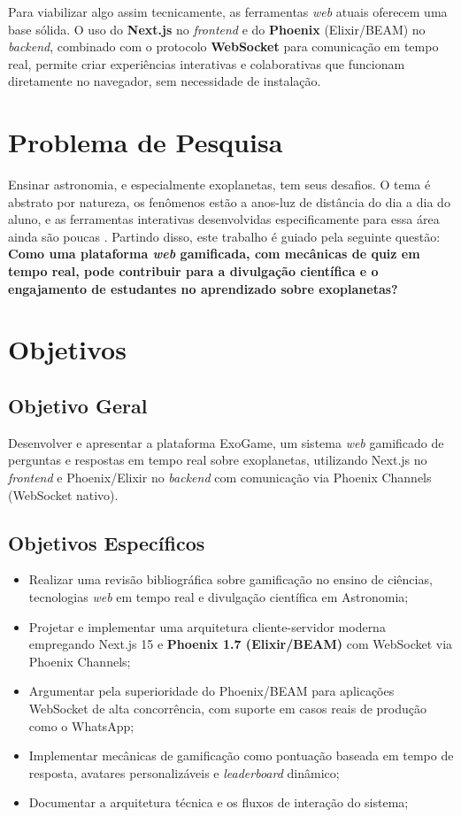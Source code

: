 \documentclass[
	12pt,
	openany,
	oneside,
	a4paper,
	english,
	brazil
]{abntex2}
\begin{document}
Para viabilizar algo assim tecnicamente, as ferramentas \textit{web} atuais oferecem uma base sólida. O uso do \textbf{Next.js} no \textit{frontend} e do \textbf{Phoenix} (Elixir/BEAM) no \textit{backend}, combinado com o protocolo \textbf{WebSocket} para comunicação em tempo real, permite criar experiências interativas e colaborativas que funcionam diretamente no navegador, sem necessidade de instalação.
\section{Problema de Pesquisa}

Ensinar astronomia, e especialmente exoplanetas, tem seus desafios. O tema é abstrato por natureza, os fenômenos estão a anos-luz de distância do dia a dia do aluno, e as ferramentas interativas desenvolvidas especificamente para essa área ainda são poucas \cite{langhi2009}. Partindo disso, este trabalho é guiado pela seguinte questão: \textbf{Como uma plataforma \textit{web} gamificada, com mecânicas de quiz em tempo real, pode contribuir para a divulgação científica e o engajamento de estudantes no aprendizado sobre exoplanetas?}

\section{Objetivos}

\subsection{Objetivo Geral}

Desenvolver e apresentar a plataforma ExoGame, um sistema \textit{web} gamificado de perguntas e respostas em tempo real sobre exoplanetas, utilizando Next.js no \textit{frontend} e Phoenix/Elixir no \textit{backend} com comunicação via Phoenix Channels (WebSocket nativo).

\subsection{Objetivos Específicos}

\begin{itemize}
  \item Realizar uma revisão bibliográfica sobre gamificação no ensino de ciências, tecnologias \textit{web} em tempo real e divulgação científica em Astronomia;
  \item Projetar e implementar uma arquitetura cliente-servidor moderna empregando Next.js 15 e \textbf{Phoenix 1.7 (Elixir/BEAM)} com WebSocket via Phoenix Channels;
  \item Argumentar pela superioridade do Phoenix/BEAM para aplicações WebSocket de alta concorrência, com suporte em casos reais de produção como o WhatsApp;
  \item Implementar mecânicas de gamificação como pontuação baseada em tempo de resposta, avatares personalizáveis e \textit{leaderboard} dinâmico;
  \item Documentar a arquitetura técnica e os fluxos de interação do sistema;

\end{itemize}
\end{document}
